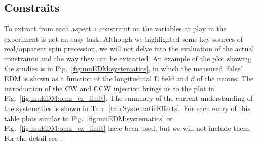 \begin{refsection}
    \subsection{Constraits} 
        To extract from each aspect a constraint on the variables at play in the experiment is not an easy task.
        Although we highlighted some key sources of real/apparent spin precession, we will not delve into the evaluation of the actual constraints and the way they can be extracted.
        An example of the plot showing the studies is in Fig.~\ref{fig:muEDM:systematics}, in which the measured `false' EDM is shown as a function of the longitudinal E field and $\beta$ of the muons.
        The introduction of the CW and CCW injection brings us to the plot in Fig.~\ref{fig:muEDM:omz_ez_limit}.
        The summary of the current understanding of the systematics is shown in Tab.~\ref{tab:SystematicEffects}.
        For each entry of this table plots similar to Fig.~\ref{fig:muEDM:systematics} or Fig.~\ref{fig:muEDM:omz_ez_limit} have been used, but we will not include them.
        For the detail see \cite{chavdar:2023}.


\end{refsection}
